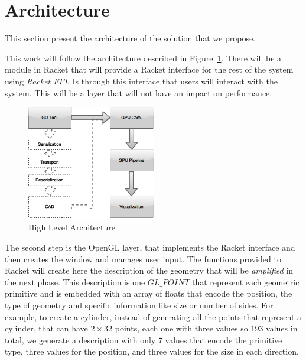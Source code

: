 
%
%

\section{Architecture} %
\label{sec:architecture}

This section present the architecture of the solution that we propose.

This work will follow the architecture described in Figure~\ref{fig:architecture}.
There will be a module in Racket that will provide a Racket interface for the rest of the system using \emph{Racket FFI}. 
Is through this interface that users will interact with the system. This will be a layer that will not have an impact on performance.


\begin{figure}
	\vspace{-15pt}
    \centering
	\includegraphics[width=0.5\textwidth]{img/Architecture/GD-Fast-Pipeline.png}
	\caption{High Level Architecture}
	\label{fig:architecture}
	\vspace{-15pt}
\end{figure}

The second step is the OpenGL layer, that implements the Racket interface and then creates the window and manages user input. The functions provided to
Racket will create here the description of the geometry that will be \emph{amplified} in the next phase. This description is one $GL\_POINT$ that
represent each geometric primitive and is embedded with an array of floats that encode the position, the type of geometry and specific information like
size or number of sides. For example, to create a cylinder, instead of generating all the points that represent a cylinder, that can have $2\times 32$ points, each one with three values so $193$ values in total, we generate a description with only 7 values that encode the primitive type, three values for the position, and three values for the size in each direction.

